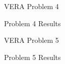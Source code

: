 \begin{frame}[t]{VERA Problem 4}
    
    
    
\end{frame}


\begin{frame}[t]{Problem 4 Results}
    
    
    
\end{frame}


\begin{frame}[t]{VERA Problem 5}
    
    
    
\end{frame}


\begin{frame}[t]{Problem 5 Results}
    
    
    
\end{frame}